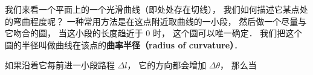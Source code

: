 

我们来看一个平面上的一个光滑曲线（即处处存在切线）， 我们如何描述它某点处的弯曲程度呢？ 一种常用方法是在这点附近取曲线的一小段， 然后做一个尽量与它吻合的圆， 当这小段的长度趋近于 0 时， 这个圆可以唯一确定． 我们把这个圆的半径叫做曲线在该点的\textbf{曲率半径（radius of curvature）}．

如果沿着它每前进一小段路程 $\Delta l$， 它的方向都会增加 $\Delta \theta$， 那么当
